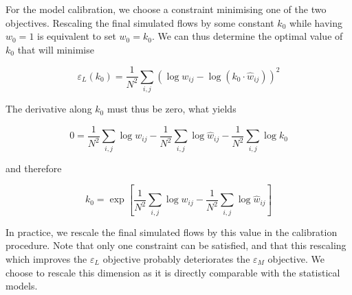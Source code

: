 For the model calibration, we choose a constraint minimising one of the two objectives. Rescaling the final simulated flows by some constant $k_0$ while having $w_0 = 1$ is equivalent to set $w_0 = k_0$. We can thus determine the optimal value of $k_0$ that will minimise

\[
\varepsilon_L (k_0) = \frac{1}{N^2} \sum_{i,j} \left(\log w_{ij} - \log \left(k_0 \cdot \hat{w}_{ij} \right) \right)^2
\]

The derivative along $k_0$ must thus be zero, what yields

\[
0 =  \frac{1}{N^2} \sum_{i,j} \log w_{ij} - \frac{1}{N^2} \sum_{i,j} \log \hat{w}_{ij} - \frac{1}{N^2} \sum_{i,j} \log k_0
\]

and therefore

\[
k_0 = \exp \left[\frac{1}{N^2} \sum_{i,j} \log w_{ij} - \frac{1}{N^2} \sum_{i,j} \log \hat{w}_{ij} \right]
\]

In practice, we rescale the final simulated flows by this value in the calibration procedure. Note that only one constraint can be satisfied, and that this rescaling which improves the $\varepsilon_L$ objective probably deteriorates the $\varepsilon_M$ objective. We choose to rescale this dimension as it is directly comparable with the statistical models.

